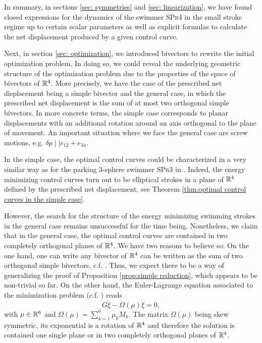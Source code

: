 In summary, in sections \ref{sec: symmetries} and \ref{sec: linearization}, we have found closed expressions for the dynamics of the swimmer \textsc{SPr4} in the small stroke regime up to certain scalar parameters as well as explicit formulas to calculate the net displacement produced by a given control curve. 

Next, in section \ref{sec: optimization}, we introduced bivectors to rewrite the initial optimization problem. In doing so, we could reveal the underlying geometric structure of the optimization problem due to the properties of the space of bivectors of $\mathbb{R}^4$. More precisely, we have the case of the prescribed net displacement being a simple bivector and the general case, in which the prescribed net displacement is the sum of at most two orthogonal simple bivectors. In more concrete terms, the simple case corresponds to planar displacements with an additional rotation around an axis orthogonal to the plane of movement. An important situation where we face the general case are screw motions, e.g. $\delta p \mid \mid e_{12} + e_{34}$.

In the simple case, the optimal control curves could be characterized in a very similar way as for the parking 3-sphere swimmer \textsc{SPr3} in \cite{Alouges2017}. Indeed, the energy minimizing control curves turn out to be elliptical strokes in a plane of $\mathbb{R}^4$ defined by the prescribed net displacement, see Theorem \ref{thm:optimal control curves in the simple case}.

However, the search for the structure of the energy minimizing swimming strokes in the general case remains unsuccessful for the time being. Nonetheless, we claim that in the general case, the optimal control curves are contained in two completely orthogonal planes of $\mathbb{R}^4$. We have two reasons to believe so: On the one hand, one can write any bivector of $\mathbb{R}^4$ can be written as the sum of two orthogonal simple bivectors, c.f. \cite{Lounesto2006}. Thus, we expect there to be a way of generalizing the proof of Proposition \ref{prop:simple reduction}, which appears to be non-trivial so far. On the other hand, the Euler-Lagrange equation associated to the minimization problem (c.f. \cite{DeSimone2011}) reads
\begin{equation}
G \ddot{\xi} - \Omega(\mu) \dot{\xi} = 0,
\end{equation}
with $\mu \in \mathbb{R}^6$ and $\Omega(\mu) = \sum_{k = 1}^{6} \mu_k M_k$. The matrix $\Omega(\mu)$ being skew symmetric, its exponential is a rotation of $\mathbb{R}^4$ and therefore the solution is contained one single plane or in two completely orthogonal planes of $\mathbb{R}^4$.